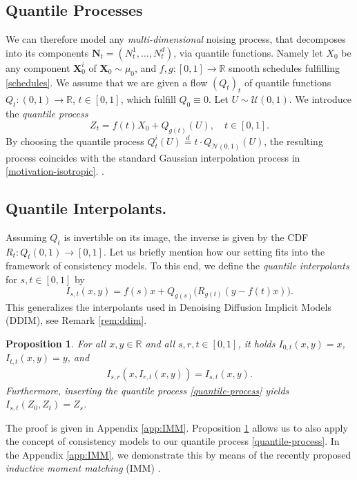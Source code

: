 \documentclass{article}
\theoremstyle{plain}
\newtheorem{proposition}[theorem]{Proposition}
\theoremstyle{definition}
\theoremstyle{remark}
\begin{document}
\subsection{Quantile Processes}
We can therefore model any \emph{multi-dimensional} noising process, that decomposes into its components $\mathbf{N}_t = (N_t^1,\dots,N_t^d)$, via quantile functions. Namely let $X_0$ be any component $\mathbf{X}_0^i$ of  $\mathbf{X}_0 \sim \mu_0$, and  $f,g : [0,1] \to \mathbb{R}$ smooth schedules  fulfilling \eqref{schedules}.
We assume that we are given a flow $(Q_t)_t$ of quantile functions
$Q_t : (0,1) \to \mathbb{R}$, $t \in [0,1]$, 
which fulfill $Q_0 \equiv 0$.
Let $U \sim \mathcal U(0,1)$. We introduce the \emph{quantile process}
\begin{equation}\label{quantile-process}
    Z_t = f(t) X_0 + Q_{g(t)}(U), \quad  t \in [0,1].
\end{equation}
By choosing the quantile process $Q_{t}^i(U)\overset{d}{=} t\cdot Q_{\mathcal{N}(0,1)}(U)$, the resulting process coincides with the standard Gaussian interpolation process in \eqref{motivation-isotropic}.
.


\subsection{Quantile Interpolants.}
Assuming $Q_t$ is invertible on its image, the inverse is given 
by the CDF $R_t : Q_t(0,1) \to [0,1]$.
Let us briefly mention how our setting fits into the framework of consistency models. 
To this end, we define the \emph{quantile interpolants} for $s,t \in [0,1]$ by
\begin{equation}\label{quantile-interpolant}
    I_{s,t}(x, y) = f(s) x + Q_{g(s)}\big(R_{g(t)}(y - f(t)x) \big).
\end{equation}
This generalizes the interpolants used in Denoising Diffusion Implicit Models (DDIM), see  Remark \ref{rem:ddim}.

\begin{proposition}\label{lem:consistent}
For all $ x, y \in \mathbb{R}$ and  all $s,r,t \in [0,1]$, it holds
   $I_{0,t}(x, y) = x$, $I_{t,t}(x, y) =  y$,
and 
\begin{align}
    I_{s,r}(x,  I_{r,t}(x,y)) 
    = I_{s,t}(x,y).
\end{align}
Furthermore, inserting the quantile process \eqref{quantile-process} yields
$I_{s,t}(Z_0, Z_t) = Z_s$.
\end{proposition}

The proof is given in Appendix \ref{app:IMM}. 
Proposition \ref{lem:consistent} allows us to also
apply the concept of consistency models to our quantile process \eqref{quantile-process}. 
In the Appendix \ref{app:IMM}, we demonstrate { this} by means of the recently proposed \emph{inductive moment matching} (IMM) \cite{IMM2025}.
\end{document}
